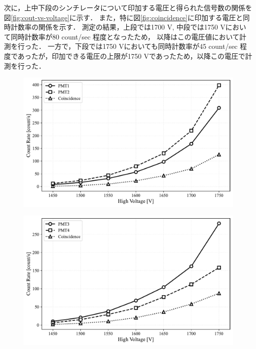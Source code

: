 \documentclass[uplatex,dvipdfmx,a4j,12pt]{jsarticle}
\begin{document}
次に，上中下段のシンチレータについて印加する電圧と得られた信号数の関係を図\ref{fig:cout-vs-voltage}に示す．
また，特に図\ref{fig:coincidence}に印加する電圧と同時計数率の関係を示す．
測定の結果，上段では1700 V, 中段では1750 Vにおいて同時計数率が80 count/sec 程度となったため，
以降はこの電圧値において計測を行った．
一方で，下段では1750 Vにおいても同時計数率が45 count/sec 程度であったが，印加できる電圧の上限が1750 Vであったため，以降この電圧で計測を行った．

\begin{figure}[H]
  \centering
  \begin{minipage}{0.85\linewidth}
    \centering
    \includegraphics[width=\linewidth]{analysis/plate1_count_vs_voltage.pdf}
    \label{fig:upper}
  \end{minipage}
  
  \begin{minipage}{0.85\linewidth}
    \centering
    \includegraphics[width=\linewidth]{analysis/plate2_count_vs_voltage.pdf}
    \label{fig:middle}
  \end{minipage}
\end{figure}
\end{document}
